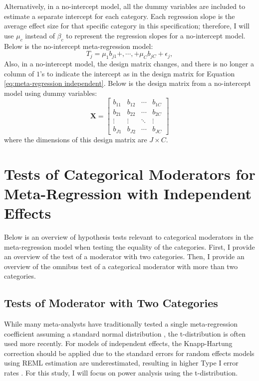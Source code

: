 Alternatively, in a no-intercept model, all the dummy variables are included to estimate a separate intercept for each category. Each regression slope is the average effect size for that specific category in this specification; therefore, I will use $\mu_c$ instead of $\beta_c$ to represent the regression slopes for a no-intercept model. Below is the no-intercept meta-regression model: 
\begin{equation}\label{eq: no-intercept independent}
    T_j =  \mu_1  b_{j1} +, \cdots, +   \mu_{C} b_{jC} + \epsilon_j,
\end{equation}
Also, in a no-intercept model, the design matrix changes, and there is no longer a column of $1$'s to indicate the intercept as in the design matrix for Equation \ref{eq:meta-regression independent}. Below is the design matrix from a no-intercept model using dummy variables: 
\begin{equation} \mathbf{X} = 
    \begin{bmatrix}
     b_{11} & b_{12} &\cdots  & b_{1C} \\
     b_{21} & b_{22} & \cdots & b_{2C}\\
     \vdots & \vdots & \ddots & \vdots\\
     b_{J1} & b_{J2} & \cdots & b_{JC}
    \end{bmatrix}
    \nonumber
\end{equation}
where the dimensions of this design matrix are $J \times C$.

\section{Tests of Categorical Moderators for Meta-Regression with Independent Effects}

Below is an overview of hypothesis tests relevant to categorical moderators in the meta-regression model when testing the equality of the categories. First, I provide an overview of the test of a moderator with two categories. Then, I provide an overview of the omnibus test of a categorical moderator with more than two categories.

\subsection{Tests of Moderator with Two Categories}

While many meta-analysts have traditionally tested a single meta-regression coefficient assuming a standard normal distribution \autocite{hedges2004}, the t-distribution is often used more recently. For models of independent effects, the Knapp-Hartung correction should be applied due to the standard errors for random effects models using REML estimation are underestimated, resulting in higher Type I error rates \autocite{cooper2019, knapp2003}. For this study, I will focus on power analysis using the t-distribution.

